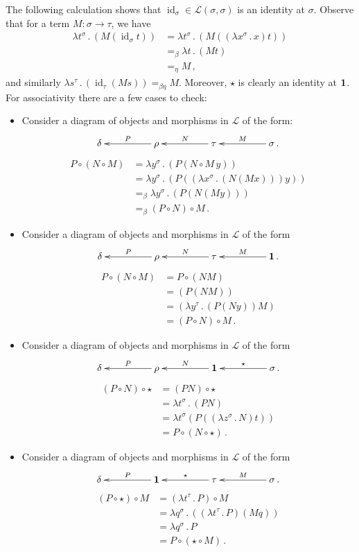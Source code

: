 \documentclass[english,letter paper,12pt,leqno]{article}
\def\be{\begin{equation}}
\def\ee{\end{equation}}
\def\ldot{\,.\,}
\DeclareMathOperator{\id}{id}
\def\typearrow{\rightarrow}
\def\be{\begin{equation}}
\def\ee{\end{equation}}
\def\ldot{\,.\,}
\def\typearrow{\Rightarrow}
\newcommand{\cat}[1]{\mathcal{#1}}
\theoremstyle{example}
\numberwithin{equation}{section}
\def\be{\begin{equation}}
\def\ee{\end{equation}}
\def\ldot{\,.\,}
\def\typearrow{\rightarrow}
\begin{document}
The following calculation shows that $\id_\sigma \in \cat{L}(\sigma, \sigma)$ is an identity at $\sigma$.
Observe that for a term $M: \sigma \typearrow \tau$, we have
\begin{align*}
	\lambda t^\sigma \ldot (M (\id_\sigma t)) &= \lambda t^\sigma \ldot (M ((\lambda x^\sigma \ldot x) t))\\
	&=_\beta \lambda t \ldot (M t)\\
	&=_\eta M\,,
\end{align*}
and similarly $\lambda s^\tau \ldot (\id_\tau (M s)) =_{\beta\eta} M$. Moreover, $\star$ is clearly an identity at $\bold{1}$. For associativity there are a few cases to check:
\begin{itemize}
	\item Consider a diagram of objects and morphisms in $\cat{L}$ of the form:
	\be
	\xymatrix@C+2pc{
		\delta & \rho \ar[l]_-{P} & \tau \ar[l]_-{N} & \sigma \ar[l]_-{M}\,.
	}
	\ee
	\begin{align*}
		P \circ (N \circ M) &= \lambda y^\sigma \ldot (P (N \circ M \,y))\\
		&= \lambda y^\sigma \ldot (P ((\lambda x^\sigma \ldot (N (M x))) y))\\
		&=_\beta \lambda y^\sigma \ldot (P (N (M y)))\\
		&=_\beta (P \circ N) \circ M\,.
	\end{align*}
	\item Consider a diagram of objects and morphisms in $\cat{L}$ of the form
	\be
	\xymatrix@C+2pc{
		\delta & \rho \ar[l]_-{P} & \tau \ar[l]_-{N} & \bold{1} \ar[l]_-{M}\,.
	}
	\ee
	\begin{align*}
		P \circ (N \circ M) &= P \circ (N M)\\
		&= (P (N M))\\
		&= (\lambda y^\tau \ldot (P (N y)) M)\\
		&= (P \circ N) \circ M\,.
	\end{align*}
	\item Consider a diagram of objects and morphisms in $\cat{L}$ of the form
	\be
	\xymatrix@C+2pc{
		\delta & \rho \ar[l]_-{P} & \bold{1} \ar[l]_-{N} & \sigma \ar[l]_-{\star}\,.
	}
	\ee
	\begin{align*}
		(P \circ N) \circ \star &= (P N) \circ \star\\
		&= \lambda t^\sigma \ldot (P N)\\
		&= \lambda t^\sigma (P ((\lambda z^\sigma \ldot N) t))\\
		&= P \circ (N \circ \star)\,.
	\end{align*}
	\item Consider a diagram of objects and morphisms in $\cat{L}$ of the form
	\be
	\xymatrix@C+2pc{
		\delta & \bold{1} \ar[l]_-{P} & \tau \ar[l]_-{\star} & \sigma \ar[l]_-{M}\,.
	}
	\ee
	\begin{align*}
		(P \circ \star) \circ M &= (\lambda t^\tau \ldot P) \circ M\\
		&= \lambda q^\sigma \ldot ( (\lambda t^\tau \ldot P) (M q))\\
		&= \lambda q^\sigma \ldot P\\
		&= P \circ ( \star \circ M)\,.
	\end{align*}
\end{itemize}
\end{document}
